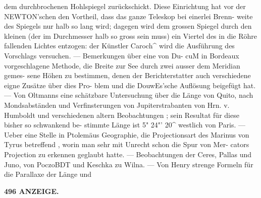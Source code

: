 \documentclass[12pt,a4paper]{article}
\begin{document}
dem  durchbrochenen  Hohlspiegel  zurückschickt. Diese  Einrichtung  hat  vor  der  NEWTON'schen  den  Vortheil,  dass  das  ganze  Teleskop  bei  einerlei  Brenn- weite des  Spiegels  nur  halb  so  lang  wird;  dagegen  wird  dem  grossen  Spiegel  durch  den  kleinen  (der im  Durchmesser  halb  so  gross  sein  muss)  ein  Viertel  des  in  die  Röhre  fallenden  Lichtes  entzogen:  der Künstler  Caroch\textasciicircum{}  wird  die  Ausführung  des  Vorschlags  versuchen.  ---  Bemerkungen  über  eine  von  Du- cuM  in  Bordeaux  vorgeschlagene  Methode,  die  Breite  zur  See  durch  zwei  ausser  dem  Meridian  gemes- sene Höhen  zu  bestimmen,  denen  der  Berichterstatter  auch  verschiedene  eigne  Zusätze  über  dies  Pro- blem und  die  DouwEs'sche  Auflösung  beigefügt  hat.  ---  Von  Oltmanns  eine  schätzbare  Untersuchung über  die  Länge  von  Quito,  nach  Mondsabständen  und  Verfinsterungen  von  Jupiterstrabanten  von  Hrn. v.  Humboldt  und  verschiedenen  altern  Beobachtungen ;  sein  Resultat  für  diese  bisher  so  schwankend  be- stimmte Länge  ist  5"  24"'  20\textasciicircum{}  westlich  von  Paris.  ---  Ueber  eine  Stelle  in  Ptolemäus  Geographie,  die Projectionsart  des  Marinus  von  Tyrus  betreffend ,  worin  man  sehr  mit  Unrecht  schon  die  Spur  von  Mer- cators  Projection  zu  erkennen  geglaubt  hatte.  ---  Beobachtungen  der  Ceres,  Pallas  und  Juno,  von PoczoBDT  und  Keschka  zu  Wilna.  ---      Von   Henry   strenge  Formeln   für  die  Parallaxe    der    Länge  und

\vspace{0.5em}


\noindent\textbf{496  ANZEIGE.}
\end{document}
